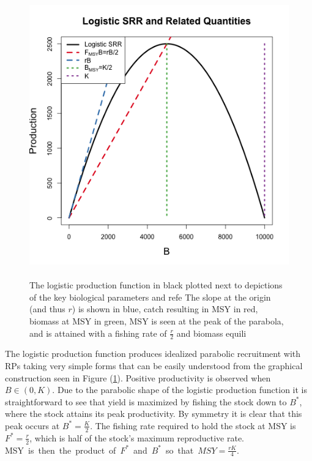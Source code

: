 \begin{figure}[h!]
\begin{minipage}[h!]{0.6\textwidth}
        \includegraphics[width=\textwidth]{./plots/srrSchaeffer.png}
\end{minipage}
\begin{minipage}[h!]{0.37\textwidth}
\caption{\label{srrSchaefer}
        \\The logistic production function in black plotted next to depictions of the key biological parameters and refe
        The slope at the origin (and thus $r$) is shown in blue, catch resulting in MSY in red, biomass at MSY in green,
        MSY is seen at the peak of the parabola, and is attained with a fishing rate of $\frac{r}{2}$ and biomass equili
}
\end{minipage}
\end{figure}

%
The logistic production function produces idealized parabolic recruitment with
RPs taking very simple forms that can be easily understood from the
graphical construction seen in Figure (\ref{srrSchaefer}). Positive
productivity is observed when \mbox{$B\in(0, K)$.} Due to the parabolic shape of the
logistic production function it is straightforward to see that yield is maximized
by fishing the stock down to $B^*$, where the stock attains its peak productivity.
By symmetry it is clear that this peak occurs at $B^*=\frac{K}{2}$. The fishing
rate required to hold the stock at MSY is $F^*=\frac{r}{2}$, which is half of the
stock's maximum reproductive rate. \mbox{MSY is then the product of $F^*$ and $B^*$
so that $MSY=\frac{rK}{4}$.}


